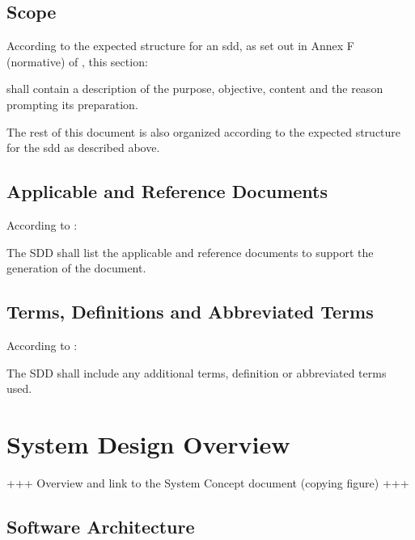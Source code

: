 \documentclass[9pt,twoside,openright,a4paper,pagesize]{report}
\begin{document}
\section{Scope}
According to the expected structure for an \gls{sdd}, as set out
in Annex F (normative) of \cite{ref:ecss-e40}, this section:
\begin{mdframed} shall contain a description of the purpose, objective, content
and the reason prompting its preparation. 
\end{mdframed}


The rest of this document is also organized according to the expected structure for the
\gls{sdd} as described above.

\section{Applicable and Reference Documents}
According to \cite{ref:ecss-e40}:
\begin{mdframed}[style=MyFrame2]
  The SDD shall list the applicable and reference documents to support the
  generation of the document. 
\end{mdframed}

\section{Terms, Definitions and Abbreviated Terms}
According to \cite{ref:ecss-e40}:
\begin{mdframed}[style=MyFrame2]
  The  SDD  shall  include  any  additional  terms,  definition  or  abbreviated
  terms used. 
\end{mdframed}


\chapter{System Design Overview}

+++ Overview and link to the System Concept
document (copying figure) +++

\label{chap:sd}
\section{Software Architecture}
\end{document}
